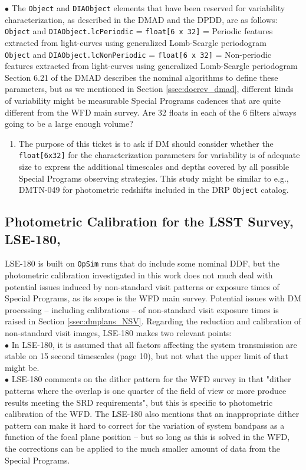 \documentclass[DM,lsstdraft,toc]{lsstdoc}
\begin{document}
$\bullet$ The {\tt Object} and {\tt DIAObject} elements that have been reserved for variability characterization, as described in the DMAD and the DPDD, are as follows: \\
{\tt Object} and {\tt DIAObject.lcPeriodic} = {\tt float[6 x 32]} = Periodic features extracted from light-curves using generalized Lomb-Scargle periodogram \\
{\tt Object} and {\tt DIAObject.lcNonPeriodic} = {\tt float[6 x 32]} = Non-periodic features extracted from light-curves using generalized Lomb-Scargle periodogram \\
Section 6.21 of the DMAD describes the nominal algorithms to define these parameters, but as we mentioned in Section \ref{ssec:docrev_dmad}, different kinds of variability might be measurable Special Programs cadences that are quite different from the WFD main survey. Are 32 floats in each of the 6 filters always going to be a large enough volume?
\begin{enumerate}[resume,topsep=-10pt,label= \textbf{Action \Roman*}] \item \label{DPDD-2} The purpose of this ticket is to ask if DM should consider whether the {\tt float[6x32]} for the characterization parameters for variability is of adequate size to express the additional timescales and depths covered by all possible Special Programs observing strategies. This study might be similar to e.g., DMTN-049 for photometric redshifts included in the DRP {\tt Object} catalog. \end{enumerate}


\subsection{Photometric Calibration for the LSST Survey, LSE-180, \cite{LSE-180}}

LSE-180 is built on {\tt OpSim} runs that do include some nominal DDF, but the photometric calibration investigated in this work does not much deal with potential issues induced by non-standard visit patterns or exposure times of Special Programs, as its scope is the WFD main survey. Potential issues with DM processing -- including calibrations -- of non-standard visit exposure times is raised in Section \ref{ssec:dmplans_NSV}. Regarding the reduction and calibration of non-standard visit images, LSE-180 makes two relevant points: \\
$\bullet$ In LSE-180, it is assumed that all factors affecting the system transmission are stable on 15 second timescales (page 10), but not what the upper limit of that might be. \\
$\bullet$ LSE-180 comments on the dither pattern for the WFD survey in that "dither patterns where the overlap is one quarter of the field of view or more produce results meeting the SRD requirements", but this is specific to photometric calibration of the WFD. The LSE-180 also mentions that an inappropriate dither pattern can make it hard to correct for the variation of system bandpass as a function of the focal plane position -- but so long as this is solved in the WFD, the corrections can be applied to the much smaller amount of data from the Special Programs.
\end{document}
